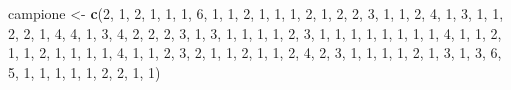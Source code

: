 \documentclass[]{book}
\newenvironment{Shaded}{\begin{snugshade}}{\end{snugshade}}
\newcommand{\KeywordTok}[1]{\textcolor[rgb]{0.13,0.29,0.53}{\textbf{#1}}}
\newcommand{\DecValTok}[1]{\textcolor[rgb]{0.00,0.00,0.81}{#1}}
\newcommand{\StringTok}[1]{\textcolor[rgb]{0.31,0.60,0.02}{#1}}
\newcommand{\NormalTok}[1]{#1}
\begin{document}
\begin{Shaded}
\begin{Highlighting}[]
\NormalTok{campione <-}\StringTok{ }\KeywordTok{c}\NormalTok{(}\DecValTok{2}\NormalTok{, }\DecValTok{1}\NormalTok{, }\DecValTok{2}\NormalTok{, }\DecValTok{1}\NormalTok{, }\DecValTok{1}\NormalTok{, }\DecValTok{1}\NormalTok{, }\DecValTok{6}\NormalTok{, }\DecValTok{1}\NormalTok{, }\DecValTok{1}\NormalTok{, }\DecValTok{2}\NormalTok{, }\DecValTok{1}\NormalTok{, }\DecValTok{1}\NormalTok{, }\DecValTok{1}\NormalTok{, }\DecValTok{2}\NormalTok{, }\DecValTok{1}\NormalTok{, }\DecValTok{2}\NormalTok{, }\DecValTok{2}\NormalTok{, }\DecValTok{3}\NormalTok{, }\DecValTok{1}\NormalTok{, }\DecValTok{1}\NormalTok{, }
              \DecValTok{2}\NormalTok{, }\DecValTok{4}\NormalTok{, }\DecValTok{1}\NormalTok{, }\DecValTok{3}\NormalTok{, }\DecValTok{1}\NormalTok{, }\DecValTok{1}\NormalTok{, }\DecValTok{2}\NormalTok{, }\DecValTok{2}\NormalTok{, }\DecValTok{1}\NormalTok{, }\DecValTok{4}\NormalTok{, }\DecValTok{4}\NormalTok{, }\DecValTok{1}\NormalTok{, }\DecValTok{3}\NormalTok{, }\DecValTok{4}\NormalTok{, }\DecValTok{2}\NormalTok{, }\DecValTok{2}\NormalTok{, }\DecValTok{2}\NormalTok{, }\DecValTok{3}\NormalTok{, }\DecValTok{1}\NormalTok{, }\DecValTok{3}\NormalTok{, }
              \DecValTok{1}\NormalTok{, }\DecValTok{1}\NormalTok{, }\DecValTok{1}\NormalTok{, }\DecValTok{1}\NormalTok{, }\DecValTok{2}\NormalTok{, }\DecValTok{3}\NormalTok{, }\DecValTok{1}\NormalTok{, }\DecValTok{1}\NormalTok{, }\DecValTok{1}\NormalTok{, }\DecValTok{1}\NormalTok{, }\DecValTok{1}\NormalTok{, }\DecValTok{1}\NormalTok{, }\DecValTok{1}\NormalTok{, }\DecValTok{1}\NormalTok{, }\DecValTok{4}\NormalTok{, }\DecValTok{1}\NormalTok{, }\DecValTok{1}\NormalTok{, }\DecValTok{2}\NormalTok{, }\DecValTok{1}\NormalTok{, }\DecValTok{1}\NormalTok{, }
              \DecValTok{2}\NormalTok{, }\DecValTok{1}\NormalTok{, }\DecValTok{1}\NormalTok{, }\DecValTok{1}\NormalTok{, }\DecValTok{1}\NormalTok{, }\DecValTok{4}\NormalTok{, }\DecValTok{1}\NormalTok{, }\DecValTok{1}\NormalTok{, }\DecValTok{2}\NormalTok{, }\DecValTok{3}\NormalTok{, }\DecValTok{2}\NormalTok{, }\DecValTok{1}\NormalTok{, }\DecValTok{1}\NormalTok{, }\DecValTok{2}\NormalTok{, }\DecValTok{1}\NormalTok{, }\DecValTok{1}\NormalTok{, }\DecValTok{2}\NormalTok{, }\DecValTok{4}\NormalTok{, }\DecValTok{2}\NormalTok{, }\DecValTok{3}\NormalTok{, }
              \DecValTok{1}\NormalTok{, }\DecValTok{1}\NormalTok{, }\DecValTok{1}\NormalTok{, }\DecValTok{1}\NormalTok{, }\DecValTok{2}\NormalTok{, }\DecValTok{1}\NormalTok{, }\DecValTok{3}\NormalTok{, }\DecValTok{1}\NormalTok{, }\DecValTok{3}\NormalTok{, }\DecValTok{6}\NormalTok{, }\DecValTok{5}\NormalTok{, }\DecValTok{1}\NormalTok{, }\DecValTok{1}\NormalTok{, }\DecValTok{1}\NormalTok{, }\DecValTok{1}\NormalTok{, }\DecValTok{1}\NormalTok{, }\DecValTok{2}\NormalTok{, }\DecValTok{2}\NormalTok{, }\DecValTok{1}\NormalTok{, }\DecValTok{1}\NormalTok{)}
\end{Highlighting}
\end{Shaded}
\end{document}
